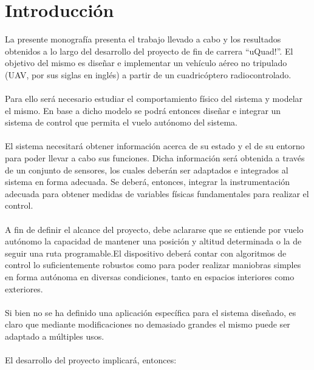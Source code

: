 \documentclass[main]{subfiles}
\begin{document}
\chapter{Introducci\'on}

La presente monograf\'ia presenta el trabajo llevado a cabo y los resultados obtenidos a lo largo del desarrollo del  proyecto de fin de carrera ``uQuad!''. El objetivo del mismo es dise\~nar e implementar un veh\'iculo a\'ereo no tripulado (UAV, por sus siglas en ingl\'es) a partir de un cuadric\'optero radiocontrolado.\\
\\
Para ello ser\'a necesario estudiar el comportamiento f\'isico del sistema y modelar el mismo. En base a dicho modelo se podr\'a entonces dise\~nar e integrar un sistema de control que permita el vuelo aut\'onomo del sistema.\\
\\
El sistema necesitar\'a obtener informaci\'on acerca de su estado y el de su entorno para poder llevar a cabo sus funciones. Dicha informaci\'on ser\'a obtenida a trav\'es de un conjunto de sensores, los cuales deber\'an ser adaptados e integrados al sistema en forma adecuada. Se deber\'a, entonces, integrar la instrumentaci\'on adecuada para obtener medidas de variables f\'isicas fundamentales para realizar el control.\\
\\
A fin de definir el alcance del proyecto, debe aclararse que se entiende por vuelo aut\'onomo la capacidad de mantener una posici\'on y altitud determinada o la de seguir una ruta programable.El dispositivo deber\'a contar con algoritmos de control lo suficientemente robustos como para poder realizar maniobras simples en forma aut\'onoma en diversas condiciones, tanto en espacios interiores como exteriores.\\
\\
Si bien no se ha definido una aplicaci\'on espec\'ifica para el sistema dise\~nado, es claro que mediante modificaciones no demasiado grandes el mismo puede ser adaptado a m\'ultiples usos.\\
\\
El desarrollo del proyecto implicar\'a, entonces:
\end{document}
